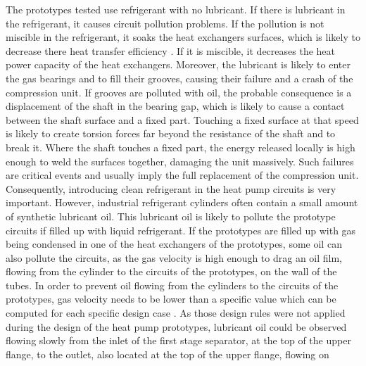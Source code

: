 The prototypes tested use refrigerant with no lubricant. If there is
lubricant in the refrigerant, it causes circuit pollution problems. If
the pollution is not miscible in the refrigerant, it soaks the heat
exchangers surfaces, which is likely to decrease there heat transfer
efficiency \citep{BandarraFilho-Thome-2009a}. If it is miscible, it
decreases the heat power capacity of the heat exchangers. Moreover,
the lubricant is likely to enter the gas bearings and to fill their
grooves, causing their failure and a crash of the compression unit. If
grooves are polluted with oil, the probable consequence is a
displacement of the shaft in the bearing gap, which is likely to cause
a contact between the shaft surface and a fixed part. Touching a fixed
surface at that speed is likely to create torsion forces far beyond
the resistance of the shaft and to break it. Where the shaft touches a
fixed part, the energy released locally is high enough to weld the
surfaces together, damaging the unit massively. Such failures are
critical events and usually imply the full replacement of the
compression unit. Consequently, introducing clean refrigerant in the
heat pump circuits is very important. However, industrial refrigerant
cylinders often contain a small amount of synthetic lubricant
oil. This lubricant oil is likely to pollute the prototype circuits if
filled up with liquid refrigerant. If the prototypes are filled up with gas being
condensed in one of the heat exchangers of the prototypes, some oil
can also pollute the circuits, as the gas velocity is high enough to
drag an oil film, flowing from the cylinder to the circuits of the
prototypes, on the wall of the tubes. In order to prevent oil flowing
from the cylinders to the circuits of the prototypes, gas velocity
needs to be lower than a specific value which can be computed for each
specific design case \citep{kesim-ileri-2000a,Guo-Shen-2011a}. As
those design rules were not applied during the design of the heat pump
prototypes, lubricant oil could be observed flowing slowly from the
inlet of the first stage separator, at the top of the upper flange, to
the outlet, also located at the top of the upper flange, flowing on
